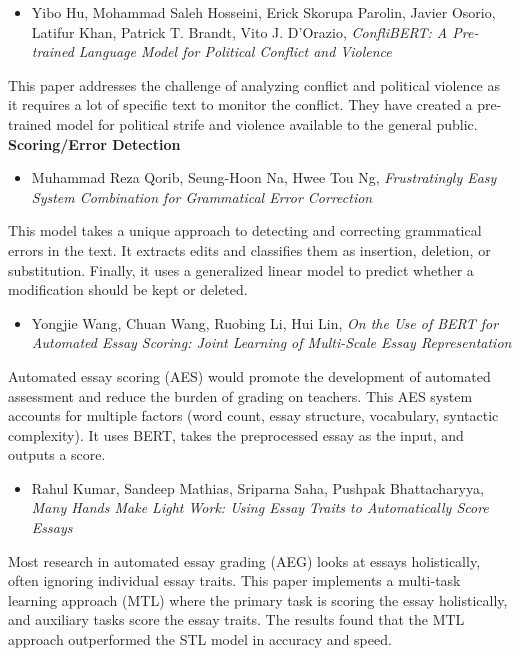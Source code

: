 \documentclass[11pt]{article}
\begin{document}
\begin{itemize}
\item Yibo Hu, Mohammad Saleh Hosseini, Erick Skorupa Parolin, Javier Osorio, Latifur Khan, Patrick T. Brandt, Vito J. D’Orazio, \emph{ConfliBERT: A Pre-trained Language Model for Political Conflict and Violence}
\end{itemize}
This paper addresses the challenge of analyzing conflict and political violence as it requires a lot of specific text to monitor the conflict. They have created a pre-trained model for political strife and violence available to the general public.  
\\[12pt]
\noindent
\textbf{Scoring/Error Detection}
\begin{itemize}
\item Muhammad Reza Qorib, Seung-Hoon Na, Hwee Tou Ng, \emph{Frustratingly Easy System Combination for Grammatical Error Correction}
\end{itemize}
This model takes a unique approach to detecting and correcting grammatical errors in the text. It extracts edits and classifies them as insertion, deletion, or substitution. Finally, it uses a generalized linear model to predict whether a modification should be kept or deleted. 

\begin{itemize}
\item Yongjie Wang, Chuan Wang, Ruobing Li, Hui Lin, \emph{On the Use of BERT for Automated Essay Scoring: Joint Learning of Multi-Scale Essay Representation}
\end{itemize}
Automated essay scoring (AES) would promote the development of automated assessment and reduce the burden of grading on teachers. This AES system accounts for multiple factors (word count, essay structure, vocabulary, syntactic complexity). It uses BERT, takes the preprocessed essay as the input, and outputs a score.

\begin{itemize}
\item Rahul Kumar, Sandeep Mathias, Sriparna Saha, Pushpak Bhattacharyya, \emph{Many Hands Make Light Work: Using Essay Traits to Automatically Score Essays}
\end{itemize}
Most research in automated essay grading (AEG) looks at essays holistically, often ignoring individual essay traits. This paper implements a multi-task learning approach (MTL) where the primary task is scoring the essay holistically, and auxiliary tasks score the essay traits. The results found that the MTL approach outperformed the STL model in accuracy and speed. 
\end{document}
